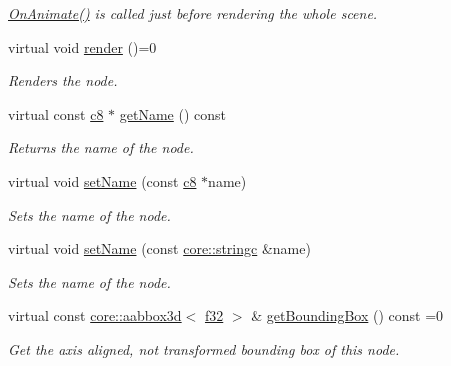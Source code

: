 \begin{DoxyCompactItemize}
\begin{DoxyCompactList}\small\item\em \hyperlink{classirr_1_1scene_1_1ISceneNode_afc1dcb5cb19116d0c7aa3d4ebdf04cc5}{On\+Animate()} is called just before rendering the whole scene. \end{DoxyCompactList}\item 
\mbox{\label{classirr_1_1scene_1_1ISceneNode_aff530cc4856792101d0aedee51ce35fa}} 
virtual void \hyperlink{classirr_1_1scene_1_1ISceneNode_aff530cc4856792101d0aedee51ce35fa}{render} ()=0
\begin{DoxyCompactList}\small\item\em Renders the node. \end{DoxyCompactList}\item 
virtual const \hyperlink{namespaceirr_a9395eaea339bcb546b319e9c96bf7410}{c8} $\ast$ \hyperlink{classirr_1_1scene_1_1ISceneNode_ab0e72b38949f926a1929468cd2b1ce16}{get\+Name} () const
\begin{DoxyCompactList}\small\item\em Returns the name of the node. \end{DoxyCompactList}\item 
virtual void \hyperlink{classirr_1_1scene_1_1ISceneNode_a810a54a2fc178b9a0e731513865f67d0}{set\+Name} (const \hyperlink{namespaceirr_a9395eaea339bcb546b319e9c96bf7410}{c8} $\ast$name)
\begin{DoxyCompactList}\small\item\em Sets the name of the node. \end{DoxyCompactList}\item 
virtual void \hyperlink{classirr_1_1scene_1_1ISceneNode_a20a22d956974f4817a20663361f20042}{set\+Name} (const \hyperlink{namespaceirr_1_1core_ab26a0e0359206b5a694f35c37c829d7f}{core\+::stringc} \&name)
\begin{DoxyCompactList}\small\item\em Sets the name of the node. \end{DoxyCompactList}\item 
virtual const \hyperlink{classirr_1_1core_1_1aabbox3d}{core\+::aabbox3d}$<$ \hyperlink{namespaceirr_a0277be98d67dc26ff93b1a6a1d086b07}{f32} $>$ \& \hyperlink{classirr_1_1scene_1_1ISceneNode_a223f718fc2f4944b5ad28c592f6cc8c6}{get\+Bounding\+Box} () const =0
\begin{DoxyCompactList}\small\item\em Get the axis aligned, not transformed bounding box of this node. \end{DoxyCompactList}\item 

\end{DoxyCompactItemize}
